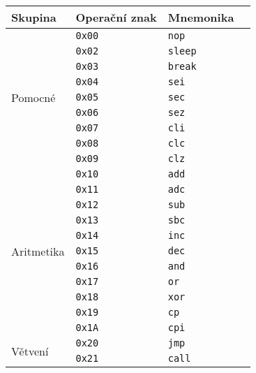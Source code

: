 \begin{table}[htbp]
\begin{center}
\begin{tabular}{| l | l | l | l |}
\hline
\textbf{Skupina} & \textbf{Operační znak} & \textbf{Mnemonika} \\
\hline
\multirow{9}{*}{Pomocné} & \texttt{0x00} & \texttt{nop} \\ \hline
                         & \texttt{0x02} & \texttt{sleep} \\ \hline
                         & \texttt{0x03} & \texttt{break} \\ \hline
                         & \texttt{0x04} & \texttt{sei} \\ \hline
                         & \texttt{0x05} & \texttt{sec} \\ \hline
                         & \texttt{0x06} & \texttt{sez} \\ \hline
                         & \texttt{0x07} & \texttt{cli} \\ \hline
                         & \texttt{0x08} & \texttt{clc} \\ \hline
                         & \texttt{0x09} & \texttt{clz} \\
\hline
\multirow{11}{*}{Aritmetika} & \texttt{0x10} & \texttt{add} \\ \hline
                             & \texttt{0x11} & \texttt{adc} \\ \hline
                             & \texttt{0x12} & \texttt{sub} \\ \hline
                             & \texttt{0x13} & \texttt{sbc} \\ \hline
                             & \texttt{0x14} & \texttt{inc} \\ \hline
                             & \texttt{0x15} & \texttt{dec} \\ \hline
                             & \texttt{0x16} & \texttt{and} \\ \hline
                             & \texttt{0x17} & \texttt{or} \\ \hline
                             & \texttt{0x18} & \texttt{xor} \\ \hline
                             & \texttt{0x19} & \texttt{cp} \\ \hline
                             & \texttt{0x1A} & \texttt{cpi} \\ \hline
\hline
\multirow{8}{*}{Větvení} & \texttt{0x20} & \texttt{jmp} \\ \hline
                         & \texttt{0x21} & \texttt{call} \\ \hline

\end{tabular}
\end{center}
\end{table}
